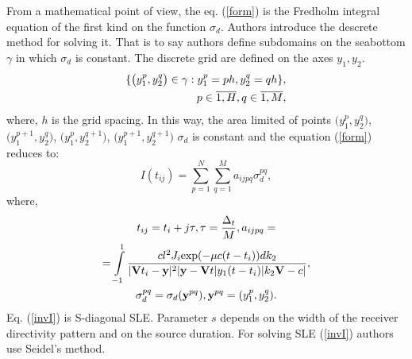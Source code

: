 \documentclass{procDDs}
\begin{document}
From a mathematical point of view, the eq. (\ref{form}) is the Fredholm integral equation of the first kind on the function $\sigma_d$. Authors introduce the descrete method for solving it. That is to say authors define subdomains on the seabottom $\gamma$ in which $\sigma_d$ is constant. The discrete grid are defined  on the axes $y_1, y_2$.
\begin{align}
	\{ \big( y_1^p, y_2^q \big) \in\gamma: y_1^p = ph, y_2^q = qh \}, \notag \\ 
	p \in \overline{1, H}, q \in \overline{1, M}, 
\end{align}
where, $h$ is the grid spacing. In this way, the area limited of points $\big(y_1^p, y_2^q\big)$, $\big(y_1^{p+1}, y_2^q\big)$, $\big(y_1^p, y_2^{q+1}\big)$, $\big(y_1^{p+1}, y_2^{q+1}\big)$ $\sigma_d$  is constant and the equation (\ref{form}) reduces to:
\begin{equation}
\label{invI}
	I(t_{ij}) = \sum \limits_{p=1}^{N} \sum \limits_{q=1}^{M} a_{ijpq}\sigma_d^{pq},
\end{equation}
where,
\begin{multline*}
t_{ij} = t_i+j\tau, \tau = \frac{\Delta_t}{M}, a_{ijpq} = \\ 
=  \int\limits_{-1}^{1}
\frac{cl^2J_i \text{exp}(-\mu c(t-t_i))dk_2}{|\mathbf{V}t_i-\mathbf{y}|^2|\mathbf{y}-\mathbf{V}t|y_1(t-t_i)|k_2 \mathbf{V}-c|}, \\
\sigma_d^{pq} = \sigma_d(\textbf{y}^{pq}), \textbf{y}^{pq} = (y_1^p, y_2^q).
\end{multline*}
Eq. (\ref{invI}) is S-diagonal SLE. Parameter $s$ depends on the width of the receiver directivity pattern and on the source duration. For solving SLE (\ref{invI}) authors use  Seidel's method.
\end{document}
